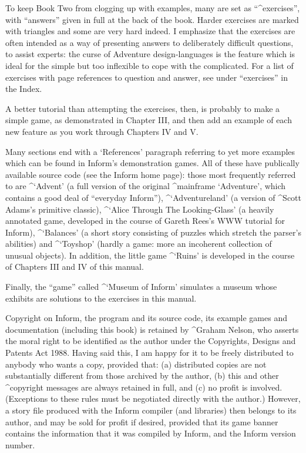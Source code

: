 To keep Book Two from clogging up with examples, many are set as
``^{exercises}'', with ``answers'' given in full at the back of the book.
Harder exercises are marked with triangles and some are very hard indeed.
I emphasize that the exercises are often intended as a way of presenting answers
to deliberately difficult questions, to assist experts: the curse of Adventure
design-languages is the feature which is ideal for the simple but too inflexible
to cope with the complicated.  For a list of exercises with page references to
question and answer, see under ``exercises'' in the Index.

A better tutorial than attempting the exercises, then, is probably to make
a simple game, as demonstrated in Chapter III, and then add an example of each
new feature as you work through Chapters IV and V.

Many sections end with a `References' paragraph referring to yet
more examples which can be found in Inform's demonstration games.  All of these
have publically available source code (see the Inform home page): those most
frequently referred to are ^{`Advent'} (a full version of the original
^{mainframe `Adventure'}, which contains a good deal of ``everyday Inform''),
^{`Adventureland'} (a version of ^{Scott Adams}'s primitive classic),
^{`Alice Through The Looking-Glass'} (a heavily annotated game, developed in
the course of Gareth Rees's WWW tutorial for Inform), ^{`Balances'} (a short
story consisting of puzzles which stretch the parser's abilities) and
^{`Toyshop'} (hardly a game: more an incoherent collection of unusual
objects).  In addition, the little game ^{`Ruins'} is developed
in the course of Chapters III and IV of this manual.

Finally, the ``game'' called ^{`Museum of Inform'} simulates a museum whose
exhibits are solutions to the exercises in this manual.

\bigskip
Copyright on Inform, the program and its source code, its example games
and documentation (including this book) is retained by ^{Graham Nelson}, who
asserts the moral right to be identified as the author under the Copyrights,
Designs and Patents Act 1988.  Having said this, I am happy for it to be freely
distributed to anybody who wants a copy, provided that: (a) distributed copies
are not substantially different from those archived by the author, (b) this and
other ^{copyright} messages are always retained in full, and (c) no profit is
involved.  (Exceptions to these rules must be negotiated directly with the
author.)  However, a story file produced with the Inform compiler (and
libraries) then belongs to its author, and may be sold for profit if desired,
provided that its game banner contains the information that it was compiled by
Inform, and the Inform version number.

